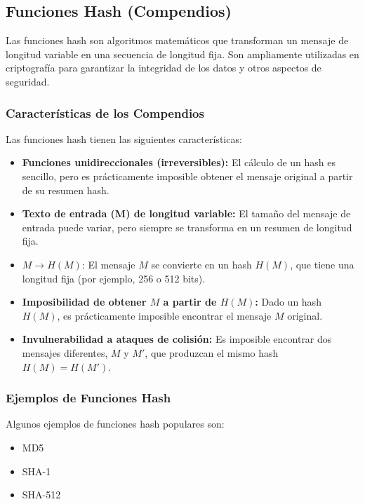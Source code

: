 \documentclass[a4paper,12pt]{article}
\begin{document}
\subsection{Funciones Hash (Compendios)}

Las funciones hash son algoritmos matemáticos que transforman un mensaje de longitud variable en una secuencia de longitud fija. Son ampliamente utilizadas en criptografía para garantizar la integridad de los datos y otros aspectos de seguridad.

\subsubsection{Características de los Compendios}

Las funciones hash tienen las siguientes características:

\begin{itemize}
    \item \textbf{Funciones unidireccionales (irreversibles):} El cálculo de un hash es sencillo, pero es prácticamente imposible obtener el mensaje original a partir de su resumen hash.
    \item \textbf{Texto de entrada (M) de longitud variable:} El tamaño del mensaje de entrada puede variar, pero siempre se transforma en un resumen de longitud fija.
    \item \( M \rightarrow H(M) \): El mensaje \( M \) se convierte en un hash \( H(M) \), que tiene una longitud fija (por ejemplo, 256 o 512 bits).
    \item \textbf{Imposibilidad de obtener \( M \) a partir de \( H(M) \):} Dado un hash \( H(M) \), es prácticamente imposible encontrar el mensaje \( M \) original.
    \item \textbf{Invulnerabilidad a ataques de colisión:} Es imposible encontrar dos mensajes diferentes, \( M \) y \( M' \), que produzcan el mismo hash \( H(M) = H(M') \).
\end{itemize}

\subsubsection{Ejemplos de Funciones Hash}

Algunos ejemplos de funciones hash populares son:

\begin{itemize}
    \item MD5
    \item SHA-1
    \item SHA-512
\end{itemize}
\end{document}
